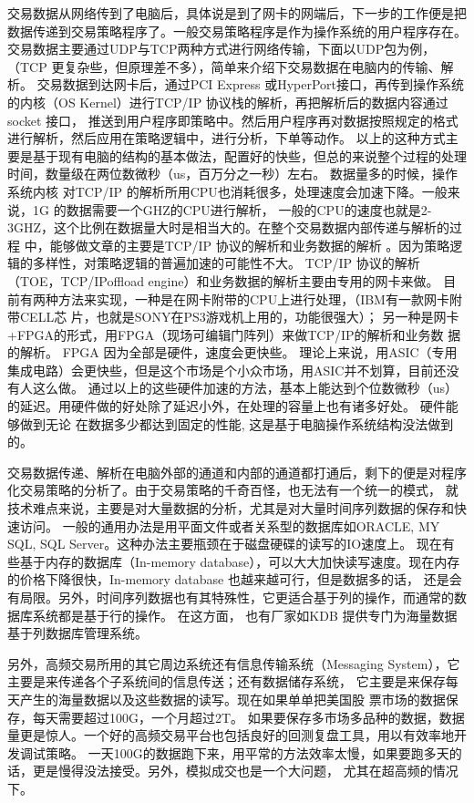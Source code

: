 交易数据从网络传到了电脑后，具体说是到了网卡的网端后，下一步的工作便是把数据传递到交易策略程序了。一般交易策略程序是作为操作系统的用户程序存在。
交易数据主要通过UDP与TCP两种方式进行网络传输，下面以UDP包为例，（TCP 更复杂些，但原理差不多），简单来介绍下交易数据在电脑内的传输、解析。
交易数据到达网卡后，通过PCI Express 或HyperPort接口，再传到操作系统的内核（OS Kernel）进行TCP/IP 协议栈的解析，再把解析后的数据内容通过socket 接口，
推送到用户程序即策略中。然后用户程序再对数据按照规定的格式进行解析，然后应用在策略逻辑中，进行分析，下单等动作。
以上的这种方式主要是基于现有电脑的结构的基本做法，配置好的快些，但总的来说整个过程的处理时间，数量级在两位数微秒（us，百万分之一秒）左右。
数据量多的时候，操作系统内核 对TCP/IP 的解析所用CPU也消耗很多，处理速度会加速下降。一般来说，1G 的数据需要一个GHZ的CPU进行解析，
一般的CPU的速度也就是2-3GHZ，这个比例在数据量大时是相当大的。在整个交易数据内部传递与解析的过程 中，能够做文章的主要是TCP/IP 协议的解析和业务数据的解析
。因为策略逻辑的多样性，对策略逻辑的普遍加速的可能性不大。 TCP/IP 协议的解析（TOE，TCP/IPoffload engine）和业务数据的解析主要由专用的网卡来做。
目前有两种方法来实现，一种是在网卡附带的CPU上进行处理，（IBM有一款网卡附带CELL芯 片，也就是SONY在PS3游戏机上用的，功能很强大）；
另一种是网卡+FPGA的形式，用FPGA（现场可编辑门阵列）来做TCP/IP的解析和业务数 据的解析。 FPGA 因为全部是硬件，速度会更快些。
理论上来说，用ASIC（专用集成电路）会更快些，但是这个市场是个小众市场，用ASIC并不划算，目前还没有人这么做。 
通过以上的这些硬件加速的方法，基本上能达到个位数微秒（us）的延迟。用硬件做的好处除了延迟小外，在处理的容量上也有诸多好处。
硬件能够做到无论 在数据多少都达到固定的性能, 这是基于电脑操作系统结构没法做到的。
	    
交易数据传递、解析在电脑外部的通道和内部的通道都打通后，剩下的便是对程序化交易策略的分析了。由于交易策略的千奇百怪，也无法有一个统一的模式，
就技术难点来说，主要是对大量数据的分析，尤其是对大量时间序列数据的保存和快速访问。
一般的通用办法是用平面文件或者关系型的数据库如ORACLE, MY SQL, SQL Server。这种办法主要瓶颈在于磁盘硬碟的读写的IO速度上。
现在有些基于内存的数据库（In-memory database），可以大大加快读写速度。现在内存的价格下降很快，In-memory database 也越来越可行，但是数据多的话，
还是会有局限。另外，时间序列数据也有其特殊性，它更适合基于列的操作，而通常的数据库系统都是基于行的操作。
在这方面， 也有厂家如KDB 提供专门为海量数据基于列数据库管理系统。
		 
另外，高频交易所用的其它周边系统还有信息传输系统（Messaging System），它主要是来传递各个子系统间的信息传送；还有数据储存系统，
它主要是来保存每天产生的海量数据以及这些数据的读写。现在如果单单把美国股 票市场的数据保存，每天需要超过100G，一个月超过2T。
如果要保存多市场多品种的数据，数据量更是惊人。一个好的高频交易平台也包括良好的回测复盘工具，用以有效率地开发调试策略。
一天100G的数据跑下来，用平常的方法效率太慢，如果要跑多天的话，更是慢得没法接受。另外，模拟成交也是一个大问题， 尤其在超高频的情况下。
		  
